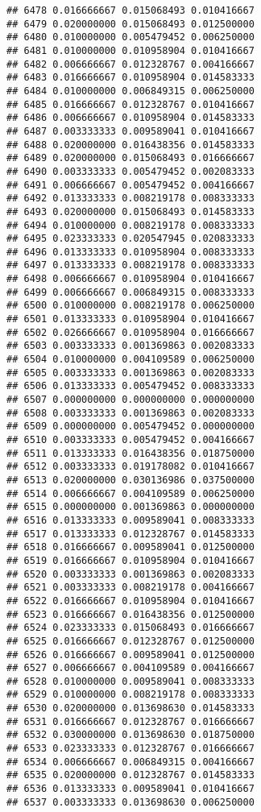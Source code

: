 \documentclass[
]{article}
\begin{document}
\begin{verbatim}
## 6478 0.016666667 0.015068493 0.010416667
## 6479 0.020000000 0.015068493 0.012500000
## 6480 0.010000000 0.005479452 0.006250000
## 6481 0.010000000 0.010958904 0.010416667
## 6482 0.006666667 0.012328767 0.004166667
## 6483 0.016666667 0.010958904 0.014583333
## 6484 0.010000000 0.006849315 0.006250000
## 6485 0.016666667 0.012328767 0.010416667
## 6486 0.006666667 0.010958904 0.014583333
## 6487 0.003333333 0.009589041 0.010416667
## 6488 0.020000000 0.016438356 0.014583333
## 6489 0.020000000 0.015068493 0.016666667
## 6490 0.003333333 0.005479452 0.002083333
## 6491 0.006666667 0.005479452 0.004166667
## 6492 0.013333333 0.008219178 0.008333333
## 6493 0.020000000 0.015068493 0.014583333
## 6494 0.010000000 0.008219178 0.008333333
## 6495 0.023333333 0.020547945 0.020833333
## 6496 0.013333333 0.010958904 0.008333333
## 6497 0.013333333 0.008219178 0.008333333
## 6498 0.006666667 0.010958904 0.010416667
## 6499 0.006666667 0.006849315 0.008333333
## 6500 0.010000000 0.008219178 0.006250000
## 6501 0.013333333 0.010958904 0.010416667
## 6502 0.026666667 0.010958904 0.016666667
## 6503 0.003333333 0.001369863 0.002083333
## 6504 0.010000000 0.004109589 0.006250000
## 6505 0.003333333 0.001369863 0.002083333
## 6506 0.013333333 0.005479452 0.008333333
## 6507 0.000000000 0.000000000 0.000000000
## 6508 0.003333333 0.001369863 0.002083333
## 6509 0.000000000 0.005479452 0.000000000
## 6510 0.003333333 0.005479452 0.004166667
## 6511 0.013333333 0.016438356 0.018750000
## 6512 0.003333333 0.019178082 0.010416667
## 6513 0.020000000 0.030136986 0.037500000
## 6514 0.006666667 0.004109589 0.006250000
## 6515 0.000000000 0.001369863 0.000000000
## 6516 0.013333333 0.009589041 0.008333333
## 6517 0.013333333 0.012328767 0.014583333
## 6518 0.016666667 0.009589041 0.012500000
## 6519 0.016666667 0.010958904 0.010416667
## 6520 0.003333333 0.001369863 0.002083333
## 6521 0.003333333 0.008219178 0.004166667
## 6522 0.016666667 0.010958904 0.010416667
## 6523 0.016666667 0.016438356 0.012500000
## 6524 0.023333333 0.015068493 0.016666667
## 6525 0.016666667 0.012328767 0.012500000
## 6526 0.016666667 0.009589041 0.012500000
## 6527 0.006666667 0.004109589 0.004166667
## 6528 0.010000000 0.009589041 0.008333333
## 6529 0.010000000 0.008219178 0.008333333
## 6530 0.020000000 0.013698630 0.014583333
## 6531 0.016666667 0.012328767 0.016666667
## 6532 0.030000000 0.013698630 0.018750000
## 6533 0.023333333 0.012328767 0.016666667
## 6534 0.006666667 0.006849315 0.004166667
## 6535 0.020000000 0.012328767 0.014583333
## 6536 0.013333333 0.009589041 0.010416667
## 6537 0.003333333 0.013698630 0.006250000

\end{verbatim}
\end{document}
